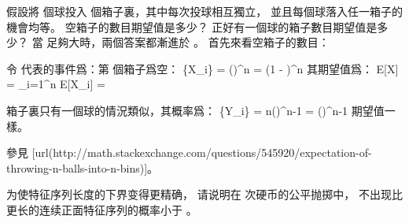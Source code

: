 \startEXERCISE \DIFFICULT
假設將  個球投入  個箱子裏，其中每次投球相互獨立，
並且每個球落入任一箱子的機會均等。
空箱子的數目期望值是多少？
正好有一個球的箱子數目期望值是多少？
\stopEXERCISE
\startANSWER
當  足夠大時，兩個答案都漸進於 。
首先來看空箱子的數目：

令  代表的事件爲：第  個箱子爲空：
\startformula
\Pr\{X_i\} = \left(\right)^n
                = \left(1 - \right)^n
                \approx {}
\stopformula
其期望值爲：
\startformula
E[X] = \sum_{i=1}^n E[X_i] = 
\stopformula

箱子裏只有一個球的情況類似，其概率爲：
\startformula
\Pr\{Y_i\} = n\left(\right)^{n-1}
                = \left(\right)^{n-1} \approx {}
\stopformula
期望值一樣。

參見 [url(http://math.stackexchange.com/questions/545920/expectation-of-throwing-n-balls-into-n-bins)]。
\stopANSWER

\startEXERCISE \DIFFICULT
为使特征序列长度的下界变得更精确，
请说明在  次硬币的公平抛掷中，
不出现比  更长的连续正面特征序列的概率小于 。
\stopEXERCISE

\startANSWER
{}
\stopANSWER

\stopsection

